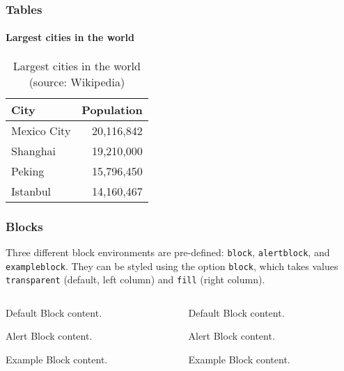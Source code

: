\documentclass[10pt]{beamer}
\begin{document}
\begin{frame}
\frametitle{Tables}
  \framesubtitle{Largest cities in the world}
  \begin{table}
    \caption{Largest cities in the world (source: Wikipedia)}
    \begin{tabular}{@{} lr @{}}
      \toprule
      City        & Population \\
      \midrule
      Mexico City & 20,116,842 \\
      Shanghai    & 19,210,000 \\
      Peking      & 15,796,450 \\
      Istanbul    & 14,160,467 \\
      \bottomrule
    \end{tabular}
  \end{table}
\end{frame}
\begin{frame}[fragile]
\frametitle{Blocks}
  Three different block environments are pre-defined: \verb|block|, \verb|alertblock|,
  and \verb|exampleblock|. They can be styled using the option
  \verb|block|, which takes values \verb|transparent| (default, left column) and \verb|fill| (right column).

  \begin{columns}[T]
    \begin{column}{0.45\textwidth}
      \begin{block}{Default}
        Block content.
      \end{block}

      \begin{alertblock}{Alert}
        Block content.
      \end{alertblock}

      \begin{exampleblock}{Example}
        Block content.
      \end{exampleblock}
    \end{column}
    \begin{column}{0.45\textwidth}
      {

        \begin{block}{Default}
          Block content.
        \end{block}

        \begin{alertblock}{Alert}
          Block content.
        \end{alertblock}

        \begin{exampleblock}{Example}
          Block content.
        \end{exampleblock}
      }
    \end{column}
  \end{columns}
\end{frame}
\end{document}
